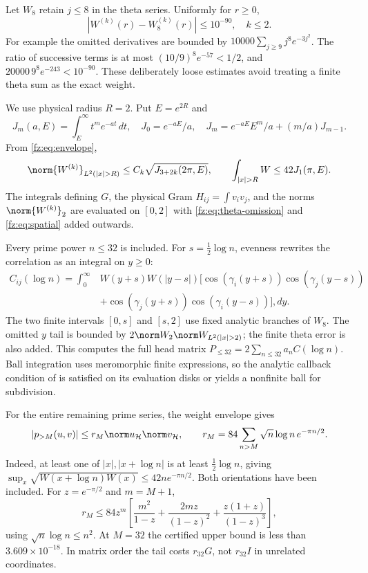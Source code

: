 \documentclass[11pt,a4paper]{article}
\numberwithin{equation}{section}
\theoremstyle{definition}\newtheorem{definition}[theorem]{Definition}
\theoremstyle{remark}\newtheorem{remark}[theorem]{Remark}
\newcommand{\Hh}{\mathcal H}\newcommand{\Hw}{\mathcal H}
\begin{document}
Let $W_8$ retain $j\le8$ in the theta series. Uniformly for $r\ge0$,
\begin{equation}\label{fz:eq:theta-omission}
 |W^{(k)}(r)-W_8^{(k)}(r)|\le10^{-90},\quad k\le2.
\end{equation}
For example the omitted derivatives are bounded by
$10000\sum_{j\ge9}j^8e^{-3j^2}$. The ratio of successive terms is
at most $(10/9)^8e^{-57}<1/2$, and
$20000\,9^8e^{-243}<10^{-90}$. These deliberately loose estimates
avoid treating a finite theta sum as the exact weight.

We use physical radius $R=2$. Put $E=e^{2R}$ and
\[
 J_m(a,E)=\int_E^\infty t^me^{-at}\,dt,
 \quad J_0=e^{-aE}/a,\quad
 J_m=e^{-aE}E^m/a+(m/a)J_{m-1}.
\]
From \eqref{fz:eq:envelope},
\begin{equation}\label{fz:eq:spatial}
 \norm{W^{(k)}}_{L^2(|x|>R)}\le C_k\sqrt{J_{3+2k}(2\pi,E)},
 \qquad \int_{|x|>R}W\le42J_1(\pi,E).
\end{equation}
The integrals defining $G$, the physical Gram $H_{ij}=\int v_iv_j$,
and the norms $\norm{W^{(k)}}_2$ are evaluated on $[0,2]$ with
\eqref{fz:eq:theta-omission} and \eqref{fz:eq:spatial} added outwards.

Every prime power $n\le32$ is included. For $s=\frac12\log n$, evenness
rewrites the correlation as an integral on $y\ge0$:
\begin{align*}
 C_{ij}(\log n)=\int_0^\infty&W(y+s)W(|y-s|)\big[
 \cos(\gamma_i(y+s))\cos(\gamma_j(y-s))\\
 &+\cos(\gamma_j(y+s))\cos(\gamma_i(y-s))\big],dy.
\end{align*}
The two finite intervals $[0,s]$ and $[s,2]$ use fixed analytic branches
of $W_8$. The omitted $y$ tail is bounded by
$2\norm W_2\norm W_{L^2(|x|>2)}$; the finite theta error is also added.
This computes the full head matrix $P_{\le32}=2\sum_{n\le32}a_nC(\log n)$.
Ball integration uses meromorphic finite expressions, so the analytic
callback condition of \cite{fzFlintIntegral} is satisfied on its evaluation
disks or yields a nonfinite ball for subdivision.

For the entire remaining prime series, the weight envelope gives
\[
 |p_{>M}(u,v)|\le r_M\norm u_{\Hh}\norm v_{\Hh},\qquad
 r_M=84\sum_{n>M}\sqrt n\log n\,e^{-\pi n/2}.
\]
Indeed, at least one of $|x|,|x+\log n|$ is at least
$\frac12\log n$, giving
$\sup_x\sqrt{W(x+\log n)W(x)}\le42n e^{-\pi n/2}$.
Both orientations have been included. For $z=e^{-\pi/2}$ and $m=M+1$,
\begin{equation}\label{fz:eq:prime-tail}
 r_M\le84z^m\left[\frac{m^2}{1-z}
             +\frac{2mz}{(1-z)^2}+\frac{z(1+z)}{(1-z)^3}\right],
\end{equation}
using $\sqrt n\log n\le n^2$. At $M=32$ the certified upper bound
is less than $3.609\times10^{-18}$. In matrix order the tail costs
$r_{32}G$, not $r_{32}I$ in unrelated coordinates.
\end{document}
